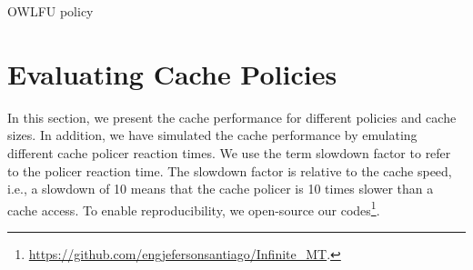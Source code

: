 \begin{algorithm}[]
\caption{OWLFU policy}
\label{algo:owlfu}
\SetInd{0.1em}{.9em}
\SetAlgoLined
\footnotesize
{}
%
%
%
%
%
\end{algorithm}

\section{Evaluating Cache Policies}

In this section, we present the cache performance for different policies and cache sizes.
In addition, we have simulated the cache performance by emulating different cache policer reaction times.
We use the term slowdown factor to refer to the policer reaction time.
The slowdown factor is relative to the cache speed, i.e., a slowdown of 10 means that the cache policer is 10 times slower than a cache access.
To enable reproducibility, we open-source our codes\footnote{\url{https://github.com/engjefersonsantiago/Infinite_MT}.}.


